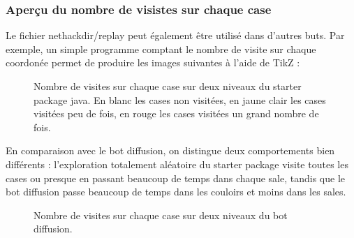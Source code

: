 \documentclass[a4paper,12pt]{article}
\begin{document}
\subsubsection{Aperçu du nombre de visistes sur chaque case}

Le fichier nethackdir/replay peut également être utilisé dans d'autres buts.
Par exemple, un simple programme comptant le nombre de visite sur chaque
coordonée permet de produire les images suivantes à l'aide de TikZ :

\begin{figure}[H]
	\caption{Nombre de visites sur chaque case sur deux niveaux du starter package java. En blanc les cases non visitées, en jaune clair les cases visitées peu de fois, en rouge les cases visitées un grand nombre de fois.}
	\resizebox{\columnwidth}{!}{}
\end{figure}

En comparaison avec le bot diffusion, on distingue deux comportements bien différents : l'exploration totalement aléatoire du starter package visite toutes les cases ou presque en passant beaucoup de temps dans chaque sale, tandis que le bot diffusion passe beaucoup de temps dans les couloirs et moins dans les sales.

\begin{figure}[H]
	\caption{Nombre de visites sur chaque case sur deux niveaux du bot diffusion.}
	\resizebox{\columnwidth}{!}{}
\end{figure}
\end{document}
